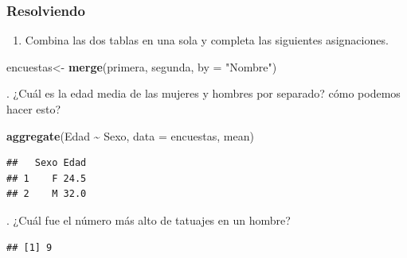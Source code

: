 \documentclass[
]{book}
\newenvironment{Shaded}{\begin{snugshade}}{\end{snugshade}}
\newcommand{\AttributeTok}[1]{\textcolor[rgb]{0.13,0.29,0.53}{#1}}
\newcommand{\FunctionTok}[1]{\textcolor[rgb]{0.13,0.29,0.53}{\textbf{#1}}}
\newcommand{\NormalTok}[1]{#1}
\newcommand{\OtherTok}[1]{\textcolor[rgb]{0.56,0.35,0.01}{#1}}
\newcommand{\SpecialCharTok}[1]{\textcolor[rgb]{0.81,0.36,0.00}{\textbf{#1}}}
\newcommand{\StringTok}[1]{\textcolor[rgb]{0.31,0.60,0.02}{#1}}
\providecommand{\tightlist}{%
  \setlength{\itemsep}{0pt}\setlength{\parskip}{0pt}}
\begin{document}
\subsubsection{Resolviendo}\label{resolviendo}

\begin{enumerate}
\def\labelenumi{\arabic{enumi}.}
\tightlist
\item
  Combina las dos tablas en una sola y completa las siguientes asignaciones.\\
\end{enumerate}

\begin{Shaded}
\begin{Highlighting}[]
\NormalTok{encuestas}\OtherTok{\textless{}{-}} \FunctionTok{merge}\NormalTok{(primera, segunda, }\AttributeTok{by =} \StringTok{"Nombre"}\NormalTok{)}
\end{Highlighting}
\end{Shaded}

\hfill{}.
¿Cuál es la edad media de las mujeres y hombres por separado?
cómo podemos hacer esto?\\

\begin{Shaded}
\begin{Highlighting}[]
\FunctionTok{aggregate}\NormalTok{(Edad }\SpecialCharTok{\textasciitilde{}}\NormalTok{ Sexo, }\AttributeTok{data =}\NormalTok{ encuestas, mean)}
\end{Highlighting}
\end{Shaded}

\begin{verbatim}
##   Sexo Edad
## 1    F 24.5
## 2    M 32.0
\end{verbatim}

\hfill{}.
¿Cuál fue el número más alto de tatuajes en un hombre?\\

\begin{Shaded}
\end{Shaded}

\begin{verbatim}
## [1] 9
\end{verbatim}
\end{document}
